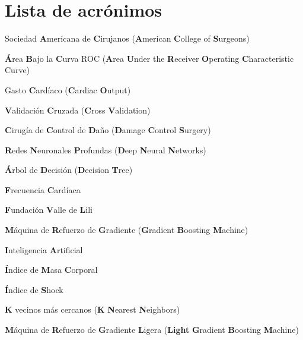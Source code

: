\documentclass[12pt, letterpaper]{article}
\begin{document}
\tableofcontents
\newpage

\section*{Lista de acrónimos}

\begin{description}[style=multiline, leftmargin=3.5cm, font=\bfseries]
    \item[ACS] Sociedad \textbf{A}mericana de \textbf{C}irujanos (\textbf{A}merican \textbf{C}ollege of \textbf{S}urgeons)
    \item[AUC-ROC] \textbf{Á}rea \textbf{B}ajo la \textbf{C}urva ROC (\textbf{A}rea \textbf{U}nder the \textbf{R}eceiver \textbf{O}perating \textbf{C}haracteristic Curve)
    \item[CO] Gasto \textbf{C}ardíaco (\textbf{C}ardiac \textbf{O}utput)
    \item[CV] \textbf{V}alidación \textbf{C}ruzada (\textbf{C}ross \textbf{V}alidation)
    \item[DCS] \textbf{C}irugía de \textbf{C}ontrol de \textbf{D}año (\textbf{D}amage \textbf{C}ontrol \textbf{S}urgery)
    \item[DNN] \textbf{R}edes \textbf{N}euronales \textbf{P}rofundas (\textbf{D}eep \textbf{N}eural \textbf{N}etworks)
    \item[DT] \textbf{Á}rbol de \textbf{D}ecisión (\textbf{D}ecision \textbf{T}ree)
    \item[FC] \textbf{F}recuencia \textbf{C}ardíaca
    \item[FVL] \textbf{F}undación \textbf{V}alle de \textbf{L}ili
    \item[GBM] \textbf{M}áquina de \textbf{R}efuerzo de \textbf{G}radiente (\textbf{G}radient \textbf{B}oosting \textbf{M}achine)
    \item[IA] \textbf{I}nteligencia \textbf{A}rtificial
    \item[IMC] \textbf{Í}ndice de \textbf{M}asa \textbf{C}orporal
    \item[IS] \textbf{Í}ndice de \textbf{S}hock
    \item[KNN] \textbf{K} vecinos más cercanos (\textbf{K} \textbf{N}earest \textbf{N}eighbors)
    \item[LightGBM] \textbf{M}áquina de \textbf{R}efuerzo de \textbf{G}radiente \textbf{L}igera (\textbf{Light} \textbf{G}radient \textbf{B}oosting \textbf{M}achine)

\end{description}
\end{document}

